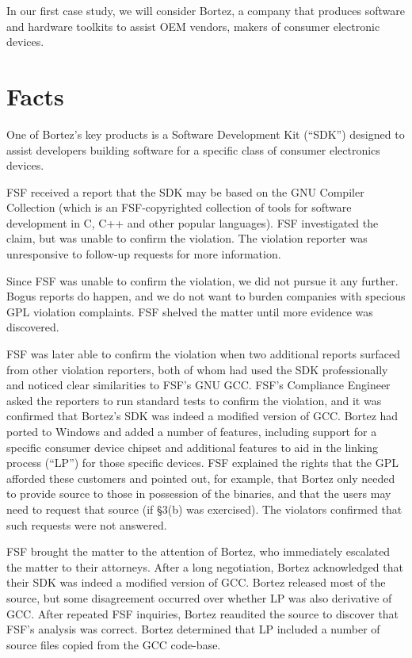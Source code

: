In our first case study, we will consider Bortez, a company that
produces software and hardware toolkits to assist OEM vendors, makers
of consumer electronic devices.

\section{Facts}

One of Bortez's key products is a Software Development Kit (``SDK'')
designed to assist developers building software for a specific class of
consumer electronics devices.

FSF received a report that the SDK may be based on the GNU Compiler
Collection (which is an FSF-copyrighted collection of tools for software
development in C, C++ and other popular languages). FSF investigated the
claim, but was unable to confirm the violation. The violation reporter
was unresponsive to follow-up requests for more information.

Since FSF was unable to confirm the violation, we did not pursue it any
further. Bogus reports do happen, and we do not want to burden companies
with specious GPL violation complaints. FSF shelved the matter until
more evidence was discovered.

FSF was later able to confirm the violation when two additional reports
surfaced from other violation reporters, both of whom had used the SDK
professionally and noticed clear similarities to FSF's GNU GCC\@. FSF's
Compliance Engineer asked the reporters to run standard tests to confirm
the violation, and it was confirmed that Bortez's SDK was indeed a
modified version of GCC\@. Bortez had ported to Windows and added a number
of features, including support for a specific consumer device chipset and
additional features to aid in the linking process (``LP'') for those
specific devices. FSF explained the rights that the GPL afforded these
customers and pointed out, for example, that Bortez only needed to provide
source to those in possession of the binaries, and that the users may need
to request that source (if \S 3(b) was exercised). The violators
confirmed that such requests were not answered.

FSF brought the matter to the attention of Bortez, who immediately
escalated the matter to their attorneys. After a long negotiation,
Bortez acknowledged that their SDK was indeed a modified version of
GCC\@. Bortez released most of the source, but some disagreement
occurred over whether LP was also derivative of GCC\@. After repeated
FSF inquiries, Bortez reaudited the source to discover that FSF's
analysis was correct. Bortez determined that LP included a number of
source files copied from the GCC code-base.

